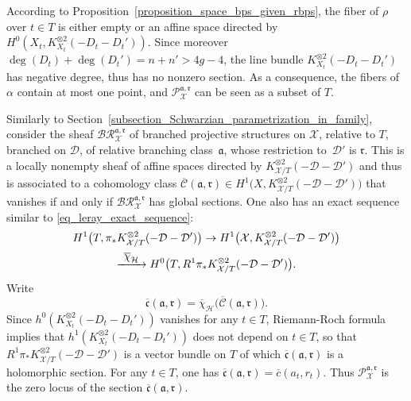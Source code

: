 \documentclass[JEP,XML,SOM,Unicode,NoEqCountersInSection,published]{cedram}
\newcommand\To[1]{\mathchoice{\xrightarrow{\textstyle\kern4pt#1\kern3pt}}{\stackrel{#1}{\longrightarrow}}{}{}}
\theoremstyle{definition}
\theoremstyle{plain}
\begin{document}
According to Proposition~\ref{proposition_space_bps_given_rbps}, the fiber of $\rho$ over $t \in T$ is either empty or an affine space directed by $H^0\left(X_t, K_{X_t}^{\otimes 2}\left(-D_t-D_t'\right)\right)$.
Since moreover $\deg(D_t)+\deg(D_t')=n+n'>4g-4$, the line bundle $K_{X_t}^{\otimes 2}\left(-D_t-D_t'\right)$ has negative degree, thus has no nonzero section.
As a consequence, the fibers of $\alpha$ contain at most one point, and $\mathcal P_{\mathcal X}^{\mathfrak a, \mathfrak r}$ can be seen as a subset of $T$.

Similarly to Section~\ref{subsection_Schwarzian_parametrization_in_family}, consider the sheaf $\mathcal B \mathcal R_{\mathcal X}^{\mathfrak a, \mathfrak r}$ of branched projective structures on $\mathcal X$, relative to $T$, branched on $\mathcal D$, of relative branching class~$\mathfrak a$, whose restriction to~$\mathcal D'$ is $\mathfrak r$.
This is a locally nonempty sheaf of affine spaces directed by $K_{\mathcal X/T}^{\otimes 2}(-\mathcal D-\mathcal D')$ and thus is associated to a cohomology class $\overline{\mathcal C}(\mathfrak a, \mathfrak r) \in H^1\bigl(X, K_{\mathcal X/T}^{\otimes 2}(-\mathcal D-\mathcal D')\bigr)$ that vanishes if and only if $\mathcal B \mathcal R_{\mathcal X}^{\mathfrak a, \mathfrak r}$ has global sections.
One also has an exact sequence similar to \eqref{eq_leray_exact_sequence}:
\begin{multline}\label{eq_leray_exact_sequence_rbps}
H^1\bigl(T, \pi_*K_{\mathcal X/T}^{\otimes 2}(-\mathcal D-\mathcal D')\bigr) \to H^1\big(\mathcal X, K_{\mathcal X/T}^{\otimes 2}(-\mathcal D - \mathcal D')\bigr)\\
\To{\overline \chi_{\mathcal H}} H^0\bigl(T, R^1\pi_*K_{\mathcal X/T}^{\otimes 2}(-\mathcal D - \mathcal D')\bigr).
\end{multline}
Write
\begin{equation*}
\overline{\mathfrak c}(\mathfrak a, \mathfrak r) = \overline \chi_{\mathcal H}\bigl(\overline{\mathcal C}(\mathfrak a, \mathfrak r)\bigr).
\end{equation*}
Since $h^0\left(K_{X_t}^{\otimes 2}\left(-D_t-D_t'\right)\right)$ vanishes for any $t \in T$, Riemann-Roch formula implies that $h^1\left(K_{X_t}^{\otimes 2}\left(-D_t-D_t'\right)\right)$ does not depend on $t \in T$, so that $R^1\pi_*K_{\mathcal X/T}^{\otimes 2}(-\mathcal D - \mathcal D')$ is a vector bundle on $T$ of which $\overline{\mathfrak c}(\mathfrak a, \mathfrak r)$ is a holomorphic section.
For any $t \in T$, one has $\overline{\mathfrak c}(\mathfrak a, \mathfrak r) = \overline c(a_t, r_t)$.
Thus $\mathcal P_{\mathcal X}^{\mathfrak a, \mathfrak r}$ is the zero locus of the section $\overline{\mathfrak c}(\mathfrak a, \mathfrak r)$.
\end{document}
